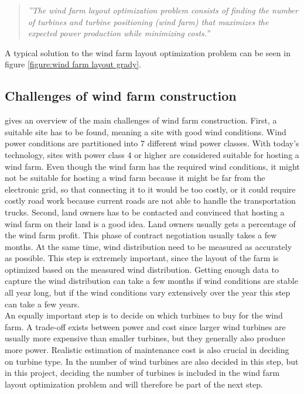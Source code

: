 \begin{quote}
\textit{''The wind farm layout optimization problem consists of finding the number of turbines and turbine positioning (wind farm) that maximizes the expected power production while minimizing costs.''}
\end{quote}


\noindent A typical solution to the wind farm layout optimization problem can be seen in figure \ref{figure:wind farm layout grady}.




\subsection{Challenges of wind farm construction}
\cite{Samorani} gives an overview of the main challenges of wind farm construction. First, a suitable site has to be found, meaning a site with good wind conditions. Wind power conditions are partitioned into 7 different wind power classes. With today's technology, sites with power class 4 or higher are considered suitable for hosting a wind farm. Even though the wind farm has the required wind conditions, it might not be suitable for hosting a wind farm because it might be far from the electronic grid, so that connecting it to it would be too costly, or it could require costly road work because current roads are not able to handle the transportation trucks. Second, land owners has to be contacted and convinced that hosting a wind farm on their land is a good idea. Land owners usually gets a percentage of the wind farm profit. This phase of contract negotiation  usually takes a few months. At the same time, wind distribution need to be measured as accurately as possible. This step is extremely important, since the layout of the farm is optimized based on the measured wind distribution. Getting enough data to capture the wind distribution can take a few months if wind conditions are stable all year long, but if the wind conditions vary extensively over the year this step can take a few years. \\

\noindent An equally important step is to decide on which turbines to buy for the wind farm. A trade-off exists between power and cost since larger wind turbines are usually more expensive than smaller turbines, but they generally also produce more power. Realistic estimation of maintenance cost is also crucial in deciding on turbine type. In \cite{Samorani} the number of wind turbines are also decided in this step, but in this project, deciding the number of turbines is included in the wind farm layout optimization problem and will therefore be part of the next step. \\

